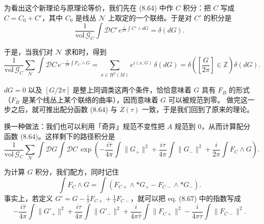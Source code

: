 为看出这个新理论与原理论等价，我们先在 (8.64) 中作 $C$ 积分：把 $C$ 写成 $C=C_{0}+C'$，其中 $C_{0}$ 是线丛 $\mathcal{N}$ 上取定的一个联络。于是对 $C'$ 的积分是
\begin{equation}
  \tag{8.65}
  \label{eq:8-65}
  \frac{1}{\mathrm{vol}\,\mathcal{G}_{C}}\int\mathcal{D}C'\,e^{\frac{i}{2\pi}\int C'\wedge dG}=\delta(dG).
\end{equation}


于是，当我们对 $\mathcal{N}$ 求和时，得到
\begin{equation}
  \tag{8.66}
  \label{eq:8-66}
  \frac{1}{\mathrm{vol}\,\mathcal{G}_{C}}\sum_{\mathcal{N}}\int\mathcal{D}C\,e^{-\frac{i}{2\pi}\int F_{C}\wedge G}=\sum_{x\in H^{2}(M)}e^{i(x,G)}\,\delta(dG)=\delta\left(\left[\frac{G}{2\pi}\right]\in\mathbb{Z}\right)\delta(dG).
\end{equation}

$dG=0$ 以及 $[G/2\pi]$ 是整上同调类这两个条件，恰恰意味着 $G$ 具有 $F_{B}$ 的形式（$F_{B}$ 是某个线丛上某个联络的曲率），因而意味着 $G$ 可以被规范到零。
做完这一步之后，就可推出配分函数 (8.64) 与 $Z(\tau)$ 一致，于是我们回到了原来的理论。

换一种做法：我们也可以利用「奇异」规范不变性把 $A$ 规范到 $0$，从而计算配分函数 (8.64)。这样剩下的路径积分是
\begin{equation}
  \tag{8.67}
  \label{eq:8-67}
  \frac{1}{\mathrm{vol}\,\mathcal{G}_{C}}\sum_{\mathcal{N}}\int\mathcal{D}G\int\mathcal{D}C\,\exp\left(-\frac{i\bar\tau}{4\pi}\int\|G_{+}\|^{2}+\frac{i\tau}{4\pi}\int\|G_{-}\|^{2}+\frac{i}{2\pi}\int F_{C}\wedge G\right).
\end{equation}

为计算 $G$ 积分，我们配方，同时记住
\begin{equation}
  \tag{8.68}
  \label{eq:8-68}
  \int F_{C}\wedge G=\int\left(F_{C+}\wedge *G_{+}-F_{C-}\wedge *G_{-}\right).
\end{equation}
事实上，若定义 $G'=G-\frac{1}{\bar\tau}F_{C+}+\frac{1}{\tau}F_{C-}$，就可以把 eq. (8.67) 中的指数写成
\begin{equation}
  \tag{8.69}
  \label{eq:8-69}
  -\frac{i\bar\tau}{4\pi}\int\|G'_{+}\|^{2}+\frac{i\tau}{4\pi}\int\|G'_{-}\|^{2}+\frac{i}{4\pi\bar\tau}\int\|F_{C+}\|^{2}-\frac{i}{4\pi\tau}\int\|F_{C-}\|^{2}.
\end{equation}

